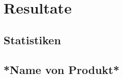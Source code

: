\chapter{Resultate}

\section{Statistiken}
\label{chap:res_stat}

\section{*Name von Produkt*}
\label{chap:res_prod}